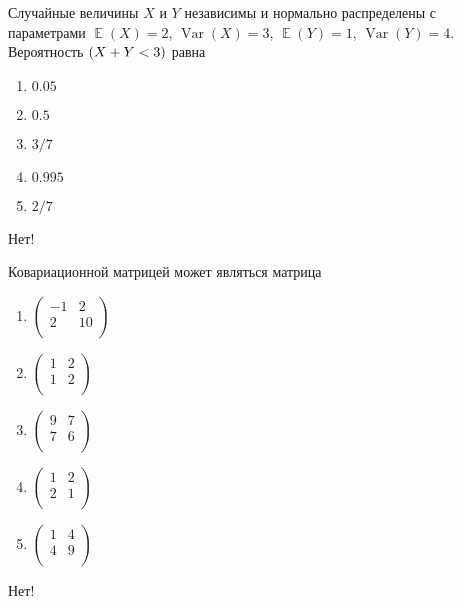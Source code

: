 \documentclass[t]{beamer}
\DeclareMathOperator{\Var}{Var}
\DeclareMathOperator{\E}{\mathbb{E}}
\let\P\relax
\DeclareMathOperator{\P}{\mathbb{P}}
\begin{document}
 \begin{frame} \label{4-No} 
\begin{block}{4} 

  Случайные величины $X$ и $Y$ независимы и нормально распределены с параметрами $\E(X)=2$, $\Var(X)=3$, $\E(Y)=1$, $\Var(Y)=4$. Вероятность $\P(X+Y<3)$ равна
  


 \end{block} 
\begin{enumerate} 
\item[] \hyperlink{4-No}{\beamergotobutton{} $0.05$}
\item[] \hyperlink{4-Yes}{\beamergotobutton{} $0.5$}
\item[] \hyperlink{4-No}{\beamergotobutton{} $3/7$}
\item[] \hyperlink{4-No}{\beamergotobutton{} $0.995$}
\item[] \hyperlink{4-No}{\beamergotobutton{} $2/7$}
\end{enumerate} 

 \alert{Нет!} 
\end{frame} 


 \begin{frame} \label{5-No} 
\begin{block}{5} 

  Ковариационной матрицей может являться матрица
  


 \end{block} 
\begin{enumerate} 
\item[] \hyperlink{5-No}{\beamergotobutton{} $\begin{pmatrix} -1 & 2 \\ 2 & 10 \\ \end{pmatrix}$}
\item[] \hyperlink{5-No}{\beamergotobutton{} $\begin{pmatrix} 1 & 2 \\ 1 & 2 \\ \end{pmatrix}$}
\item[] \hyperlink{5-Yes}{\beamergotobutton{} $\begin{pmatrix} 9 & 7 \\ 7 & 6 \\ \end{pmatrix}$}
\item[] \hyperlink{5-No}{\beamergotobutton{} $\begin{pmatrix} 1 & 2 \\ 2 & 1 \\ \end{pmatrix}$}
\item[] \hyperlink{5-No}{\beamergotobutton{} $\begin{pmatrix} 1 & 4 \\ 4 & 9 \\ \end{pmatrix}$}
\end{enumerate} 

 \alert{Нет!} 
\end{frame} 
\end{document}
